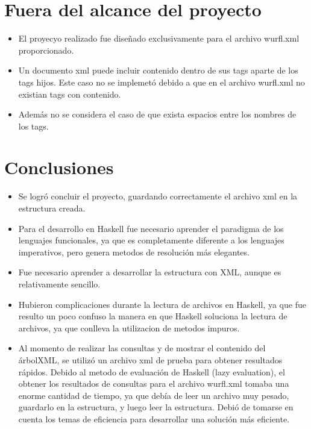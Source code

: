 \documentclass[11pt]{article} %
\begin{document}
\section{Fuera del alcance del proyecto}
\begin{itemize}
	\item El proyecyo realizado fue diseñado exclusivamente para el archivo wurfl.xml proporcionado.
        \item Un documento xml puede incluir contenido dentro de sus tags aparte de los tags hijos. Este caso no se implemetó debido a que en el archivo wurfl.xml no existian tags con contenido.
        \item Además no se considera el caso de que exista espacios entre los nombres de los tags.
\end{itemize}

\section{Conclusiones}
\begin{itemize}
	\item Se logró concluir el proyecto, guardando correctamente el archivo xml en la estructura creada.
	\item Para el desarrollo en Haskell fue necesario aprender el paradigma de los lenguajes funcionales, ya que es completamente diferente a los lenguajes imperativos, pero genera metodos de resolución más elegantes.
	\item Fue necesario aprender a desarrollar la estructura con XML, aunque es relativamente sencillo.
	\item Hubieron complicaciones durante la lectura de archivos en Haskell, ya que fue resulto un poco confuso la manera en que Haskell soluciona la lectura de archivos, ya que conlleva la utilizacion de metodos impuros.
        \item Al momento de realizar las consultas y de mostrar el contenido del árbolXML, se utilizó un archivo xml de prueba para obtener resultados rápidos. Debido al metodo de evaluación de Haskell (lazy evaluation), el obtener los resultados de consultas para el archivo wurfl.xml tomaba una enorme cantidad de tiempo, ya que debía de leer un archivo muy pesado, guardarlo en la estructura, y luego leer la estructura. Debió de tomarse en cuenta los temas de eficiencia para desarrollar una solución más eficiente.
\end{itemize}
\end{document}
